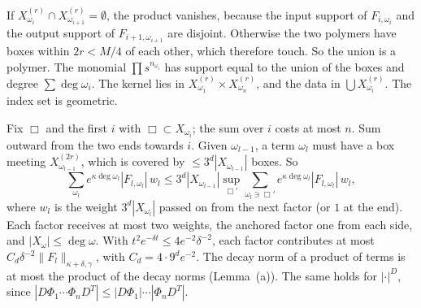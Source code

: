 \begin{detail}\label{d9:chain}
\begin{step}[Terms]
If $X^{(r)}_{\omega_i}\cap X^{(r)}_{\omega_{i+1}}=\emptyset$, the product vanishes, because the input support of $F_{i,\omega_i}$ and the output support of $F_{i+1,\omega_{i+1}}$ are disjoint. Otherwise the two polymers have boxes within $2r<M/4$ of each other, which therefore touch. So the union is a polymer. The monomial $\prod s^{n_{\omega_i}}$ has support equal to the union of the boxes and degree $\sum\deg\omega_i$. The kernel lies in $X^{(r)}_{\omega_1}\times X^{(r)}_{\omega_n}$, and the data in $\bigcup X^{(r)}_{\omega_i}$. The index set is geometric.
\end{step}
\begin{step}[Counting]
Fix $\Box$ and the first $i$ with $\Box\subset X_{\omega_i}$; the sum over $i$ costs at most $n$. Sum outward from the two ends towards $i$. Given $\omega_{l-1}$, a term $\omega_l$ must have a box meeting $X^{(2r)}_{\omega_{l-1}}$, which is covered by $\le3^d|X_{\omega_{l-1}}|$ boxes. So
\[
\sum_{\omega_l}e^{\kappa\deg\omega_l}|F_{l,\omega_l}|\,w_l\le3^d|X_{\omega_{l-1}}|\sup_{\Box'}\sum_{\omega_l\ni\Box'}e^{\kappa\deg\omega_l}|F_{l,\omega_l}|\,w_l ,
\]
where $w_l$ is the weight $3^d|X_{\omega_l}|$ passed on from the next factor (or $1$ at the end). Each factor receives at most two weights, the anchored factor one from each side, and $|X_\omega|\le\deg\omega$. With $t^2e^{-\delta t}\le4e^{-2}\delta^{-2}$, each factor contributes at most $C_d\delta^{-2}\|F_l\|_{\kappa+\delta,\gamma}$, with $C_d=4\cdot9^de^{-2}$. The decay norm of a product of terms is at most the product of the decay norms (Lemma~(a)). The same holds for $|\cdot|^D$, since $|D\Phi_1\cdots\Phi_nD^T|\le|D\Phi_1|\cdots|\Phi_nD^T|$.
\end{step}
\end{detail}

